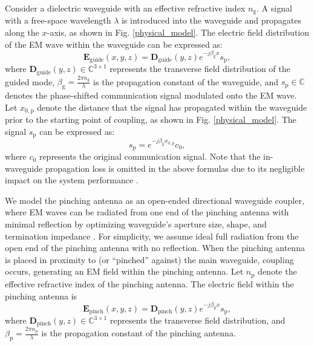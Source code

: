 Consider a dielectric waveguide with an effective refractive index $n_{\mathrm{g}}$. A signal with a free-space wavelength $\lambda$ is introduced into the waveguide and propagates along the $x$-axis, as shown in Fig. \ref{physical_model}. The electric field distribution of the EM wave within the waveguide can be expressed as:
\begin{equation} \label{EM_model_waveguide}
    \mathbf{E}_{\mathrm{guide}}(x,y,z) = \mathbf{D}_{\mathrm{guide}}(y,z) e^{-j \beta_{\mathrm{g}} x} s_{\mathrm{p}},
\end{equation}
where $\mathbf{D}_{\mathrm{guide}}(y,z) \in \mathbb{C}^{3 \times 1}$ represents the transverse field distribution of the guided mode, $\beta_{\mathrm{g}} = \frac{2 \pi n_{\mathrm{g}}}{\lambda}$ is the propagation constant of the waveguide, and $s_{\mathrm{p}} \in \mathbb{C}$ denotes the phase-shifted communication signal modulated onto the EM wave. Let $x_{0, \mathrm{p}}$ denote the distance that the signal has propagated within the waveguide prior to the starting point of coupling, as shown in Fig. \ref{physical_model}. The signal $s_{\mathrm{p}}$ can be expressed as:
\begin{equation}
    s_{\mathrm{p}} = e^{-j \beta_{\mathrm{g}} x_{0, \mathrm{p}}} c_0,
\end{equation}
where $c_0$ represents the original communication signal. Note that the in-waveguide propagation loss is omitted in the above formulas due to its negligible impact on the system performance \cite{ding2024flexible}. 

We model the pinching antenna as an open-ended directional waveguide coupler, where EM waves can be radiated from one end of the pinching antenna with minimal reflection by optimizing waveguide's aperture size, shape, and termination impedance \cite{gardiol1985open}. For simplicity, we assume ideal full radiation from the open end of the pinching antenna with no reflection. When the pinching antenna is placed in proximity to (or “pinched” against) the main waveguide, coupling occurs, generating an EM field within the pinching antenna. Let $n_{\mathrm{p}}$ denote the effective refractive index of the pinching antenna. The electric field within the pinching antenna is
\begin{equation}
    \mathbf{E}_{\mathrm{pinch}}(x,y,z) = \mathbf{D}_{\mathrm{pinch}}(y,z) e^{-j \beta_{\mathrm{p}} x} s_{\mathrm{p}},
\end{equation}
where $\mathbf{D}_{\mathrm{pinch}}(y,z) \in \mathbb{C}^{3 \times 1}$ represents the transverse field distribution, and $\beta_{\mathrm{p}} = \frac{2 \pi n_{\mathrm{p}}}{\lambda}$ is the propagation constant of the pinching antenna.

